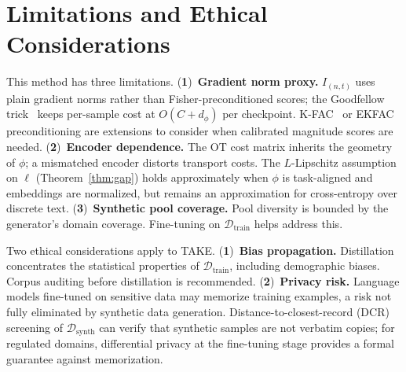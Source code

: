 \section{Limitations and Ethical Considerations} \label{sec:55-research03-limitations}

\begin{foldable} %
  This method has three limitations.
  (\textbf{1})~\textbf{Gradient norm proxy.}
  $I_{(n,t)}$ uses plain gradient norms rather than Fisher-preconditioned scores; the Goodfellow trick~\cite{goodfellow2015efficient} keeps per-sample cost at $O(C + d_\phi)$ per checkpoint.
  K-FAC~\cite{martens2015optimizing} or EKFAC~\cite{george2018fast} preconditioning are extensions to consider when calibrated magnitude scores are needed.
  (\textbf{2})~\textbf{Encoder dependence.}
  The \ac{OT} cost matrix inherits the geometry of $\phi$; a mismatched encoder distorts transport costs.
  The $L$-Lipschitz assumption on $\ell$ (Theorem~\ref{thm:gap}) holds approximately when $\phi$ is task-aligned and embeddings are normalized, but remains an approximation for cross-entropy over discrete text.
  (\textbf{3})~\textbf{Synthetic pool coverage.}
  Pool diversity is bounded by the generator's domain coverage.
  Fine-tuning on $\mathcal{D}_\text{train}$ helps address this.
\end{foldable}

\begin{foldable} %
  Two ethical considerations apply to TAKE.
  (\textbf{1})~\textbf{Bias propagation.}
  Distillation concentrates the statistical properties of $\mathcal{D}_\text{train}$, including demographic biases.
  Corpus auditing before distillation is recommended.
  (\textbf{2})~\textbf{Privacy risk.}
  Language models fine-tuned on sensitive data may memorize training examples, a risk not fully eliminated by synthetic data generation.
  Distance-to-closest-record (DCR) screening of $\mathcal{D}_\text{synth}$ can verify that synthetic samples are not verbatim copies; for regulated domains, differential privacy at the fine-tuning stage provides a formal guarantee against memorization.
\end{foldable}
